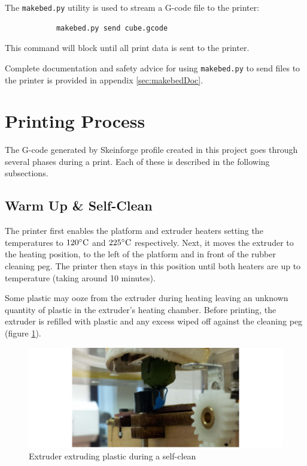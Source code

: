 		The \verb|makebed.py| utility is used to stream a G-code file to the
		printer:
		\begin{verbatim}
			makebed.py send cube.gcode
		\end{verbatim}
		This command will block until all print data is sent to the printer.
		
		Complete documentation and safety advice for using \verb|makebed.py| to send
		files to the printer is provided in appendix \ref{sec:makebedDoc}.
			
	\section{Printing Process}
		
		The G-code generated by Skeinforge profile created in this project
		goes through several phases during a print. Each of these is described in
		the following subsections.
		
		\subsection{Warm Up \& Self-Clean}
			
			The printer first enables the platform and extruder heaters setting the
			temperatures to $120^\circ\textrm{C}$ and $225^\circ\textrm{C}$ respectively. Next, it moves the
			extruder to the heating position, to the left of the platform and in front
			of the rubber cleaning peg. The printer then stays in this position until
			both heaters are up to temperature (taking around 10 minutes).
			
			Some plastic may ooze from the extruder during heating leaving an unknown
			quantity of plastic in the extruder's heating chamber. Before printing,
			the extruder is refilled with plastic and any excess wiped off against the
			cleaning peg (figure \ref{fig:selfClean}).
			
			\begin{figure}
				\includegraphics[width=1\textwidth]{diagrams/selfClean.pdf}
				\caption{Extruder extruding plastic during a self-clean}
				\label{fig:selfClean}
			\end{figure}
		

